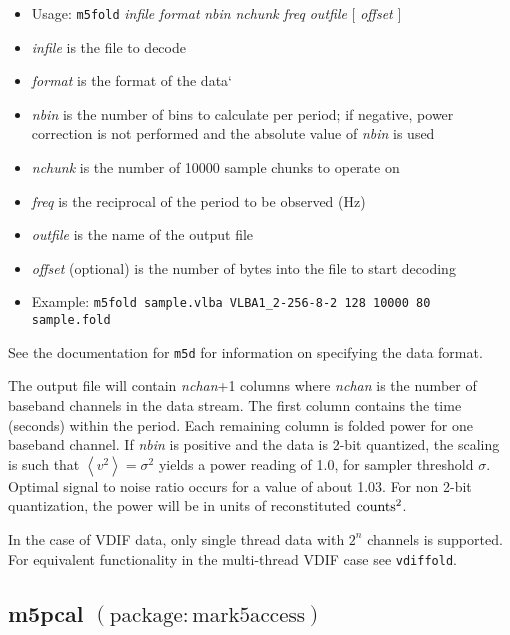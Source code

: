 \begin{itemize}
\item[] Usage: {\tt m5fold} {\em infile} {\em format} {\em nbin} {\em nchunk} {\em freq} {\em outfile} $[$ {\em offset} $]$ 
\item[] {\em infile} is the file to decode
\item[] {\em format} is the format of the data`
\item[] {\em nbin} is the number of bins to calculate per period; if negative, power correction is not performed and the absolute value of {\em nbin} is used
\item[] {\em nchunk} is the number of 10000 sample chunks to operate on
\item[] {\em freq} is the reciprocal of the period to be observed (Hz)
\item[] {\em outfile} is the name of the output file
\item[] {\em offset} (optional) is the number of bytes into the file to start decoding
\item[] Example: {\tt m5fold sample.vlba VLBA1\_2-256-8-2 128 10000 80 sample.fold}
\end{itemize}

See the documentation for {\tt m5d} for information on specifying the data format.

The output file will contain {\em nchan}+1 columns where {\em nchan} is the number of baseband channels in the data stream.
The first column contains the time (seconds) within the period.
Each remaining column is folded power for one baseband channel.
If {\em nbin} is positive and the data is 2-bit quantized, the scaling is such that $\left<v^2\right> = \sigma^2$ yields a power reading of 1.0, for sampler threshold $\sigma$.
Optimal signal to noise ratio occurs for a value of about 1.03.
For non 2-bit quantization, the power will be in units of reconstituted ${\rm counts}^2$.

In the case of VDIF data, only single thread data with $2^n$ channels is supported.
For equivalent functionality in the multi-thread VDIF case see {\tt vdiffold}.









\subsection{m5pcal {\small $\mathrm{(package: mark5access)}$}} \label{sec:m5pcal}

